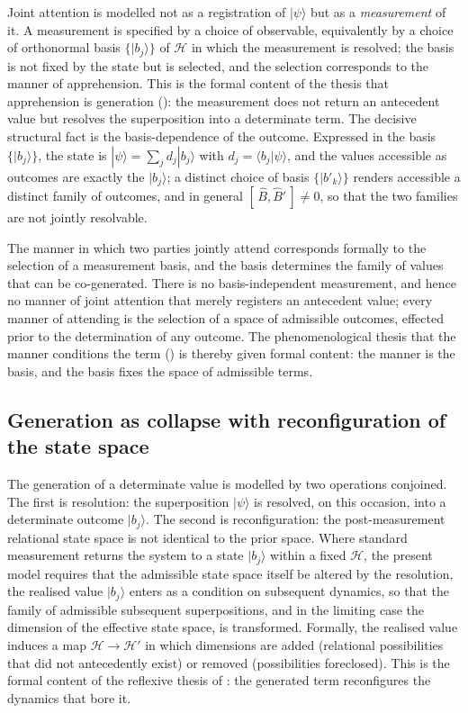 Joint attention is modelled not as a registration of $|\psi\rangle$ but as a \emph{measurement} of it. A measurement is specified by a choice of observable, equivalently by a choice of orthonormal basis $\{|b_j\rangle\}$ of $\mathcal{H}$ in which the measurement is resolved; the basis is not fixed by the state but is selected, and the selection corresponds to the manner of apprehension. This is the formal content of the thesis that apprehension is generation (): the measurement does not return an antecedent value but resolves the superposition into a determinate term. The decisive structural fact is the basis-dependence of the outcome. Expressed in the basis $\{|b_j\rangle\}$, the state is $|\psi\rangle = \sum_j d_j |b_j\rangle$ with $d_j = \langle b_j | \psi\rangle$, and the values accessible as outcomes are exactly the $|b_j\rangle$; a distinct choice of basis $\{|b'_k\rangle\}$ renders accessible a distinct family of outcomes, and in general $[\,\hat{B}, \hat{B}'\,] \neq 0$, so that the two families are not jointly resolvable.

\begin{claim}
The manner in which two parties jointly attend corresponds formally to the selection of a measurement basis, and the basis determines the family of values that can be co-generated. There is no basis-independent measurement, and hence no manner of joint attention that merely registers an antecedent value; every manner of attending is the selection of a space of admissible outcomes, effected prior to the determination of any outcome. The phenomenological thesis that the manner conditions the term () is thereby given formal content: the manner is the basis, and the basis fixes the space of admissible terms.
\end{claim}

\subsection{Generation as collapse with reconfiguration of the state space}
\label{p10:sec:collapse}

The generation of a determinate value is modelled by two operations conjoined. The first is resolution: the superposition $|\psi\rangle$ is resolved, on this occasion, into a determinate outcome $|b_j\rangle$. The second is reconfiguration: the post-measurement relational state space is not identical to the prior space. Where standard measurement returns the system to a state $|b_j\rangle$ within a fixed $\mathcal{H}$, the present model requires that the admissible state space itself be altered by the resolution, the realised value $|b_j\rangle$ enters as a condition on subsequent dynamics, so that the family of admissible subsequent superpositions, and in the limiting case the dimension of the effective state space, is transformed. Formally, the realised value induces a map $\mathcal{H} \to \mathcal{H}'$ in which dimensions are added (relational possibilities that did not antecedently exist) or removed (possibilities foreclosed). This is the formal content of the reflexive thesis of : the generated term reconfigures the dynamics that bore it.

